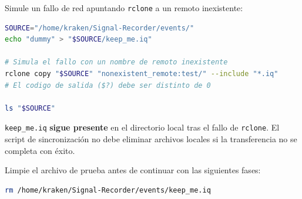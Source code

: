 Simule un fallo de red apuntando \texttt{rclone} a un remoto inexistente:

\begin{lstlisting}[language=bash]
SOURCE="/home/kraken/Signal-Recorder/events/"
echo "dummy" > "$SOURCE/keep_me.iq"

# Simula el fallo con un nombre de remoto inexistente
rclone copy "$SOURCE" "nonexistent_remote:test/" --include "*.iq"
# El codigo de salida ($?) debe ser distinto de 0

ls "$SOURCE"
\end{lstlisting}

\begin{tcolorbox}[colback=gray!5, colframe=deyposcolor, title=Resultado esperado (T-19)]
\texttt{keep\_me.iq} \textbf{sigue presente} en el directorio local tras el fallo de \texttt{rclone}. El script de sincronización no debe eliminar archivos locales si la transferencia no se completa con éxito.
\end{tcolorbox}

Limpie el archivo de prueba antes de continuar con las siguientes fases:

\begin{lstlisting}[language=bash]
rm /home/kraken/Signal-Recorder/events/keep_me.iq
\end{lstlisting}
